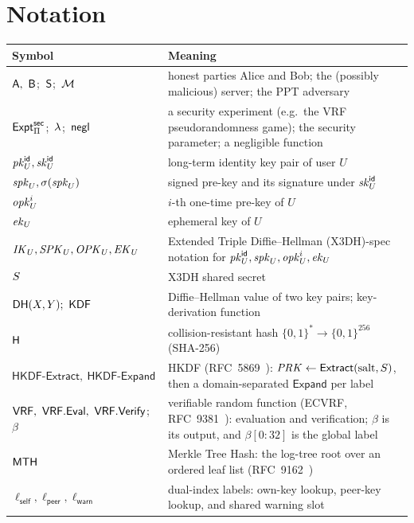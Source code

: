 \documentclass[11pt,a4paper,oneside]{report}
\theoremstyle{definition}
\begin{document}
\chapter*{Notation}
\begingroup
\small
\centering
\renewcommand{\arraystretch}{0.94}
\begin{tabular}{@{}lp{9.5cm}@{}}
\toprule
Symbol & Meaning \\
\midrule
$\A,\ \B$;\ $\Srv$;\ $\Adv$ & honest parties Alice and Bob; the (possibly malicious) server; the PPT adversary \\
$\Expt{sec}{\Pi}$;\ $\secpar$;\ $\negl$ & a security experiment (e.g.\ the VRF pseudorandomness game); the security parameter; a negligible function \\
$\pkid{U}, \skid{U}$ & long-term identity key pair of user $U$ \\
$\spk{U}, \sig{\spk{U}}$ & signed pre-key and its signature under $\skid{U}$ \\
$\opk{U}{i}$ & $i$-th one-time pre-key of $U$ \\
$\ek{U}$ & ephemeral key of $U$ \\
$\xIK{U},\xSPK{U},\xOPK{U},\xEK{U}$ & Extended Triple Diffie--Hellman (X3DH)-spec notation for $\pkid{U},\spk{U},\opk{U}{i},\ek{U}$ \\
$\sharedS$ & X3DH shared secret \\
$\DH{X}{Y};\ \KDF$ & Diffie--Hellman value of two key pairs; key-derivation function \\
$\Hash$ & collision-resistant hash $\{0,1\}^*\!\to\!\{0,1\}^{256}$ (SHA-256) \\
$\mathsf{HKDF}\text{-}\mathsf{Extract},\ \mathsf{HKDF}\text{-}\mathsf{Expand}$ & HKDF (RFC~5869~\cite{rfc5869}): $\mathit{PRK}\gets\mathsf{Extract}(\text{salt},\sharedS)$, then a domain-separated $\mathsf{Expand}$ per label \\
$\VRF,\ \VRFeval,\ \VRFvfy$;\ $\beta$ & verifiable random function (ECVRF,
RFC~9381~\cite{rfc9381}): evaluation and verification; $\beta$ is its output, and
$\beta[0{:}32]$ is the global label \\
$\MTH$ & Merkle Tree Hash: the log-tree root over an ordered leaf list (RFC~9162~\cite{rfc9162}) \\
$\ell_{\mathsf{self}}, \ell_{\mathsf{peer}}, \ell_{\mathsf{warn}}$ & dual-index labels: own-key lookup, peer-key lookup, and shared warning slot \\

\end{tabular}
\end{document}
